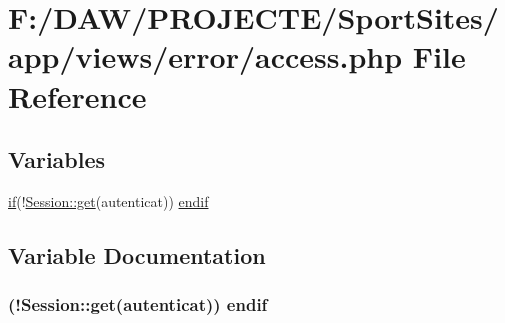 \hypertarget{access_8php}{}\section{F\+:/\+D\+A\+W/\+P\+R\+O\+J\+E\+C\+T\+E/\+Sport\+Sites/app/views/error/access.php File Reference}
\label{access_8php}
\subsection*{Variables}
\begin{DoxyCompactItemize}
\item 
\hyperlink{app_2views_2index_2index_8php_af71ebd4d252438a1590e85e150ce8954}{if}(!\hyperlink{class_session_acf4e501ef0dfb6e98762fbecc9d75b9a}{Session\+::get}(\textquotesingle{}autenticat\textquotesingle{})) \hyperlink{access_8php_a7ddea6d1adfb71ceedcf68fe13c3e78f}{endif}
\end{DoxyCompactItemize}


\subsection{Variable Documentation}
\hypertarget{access_8php_a7ddea6d1adfb71ceedcf68fe13c3e78f}{}
\subsubsection[{endif}]{ (!{\bf Session\+::get}(\textquotesingle{}autenticat\textquotesingle{})) endif}\label{access_8php_a7ddea6d1adfb71ceedcf68fe13c3e78f}
